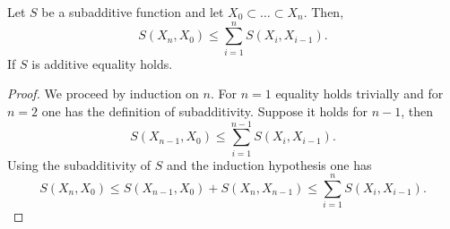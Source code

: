 \bigskip

\begin{lemma}
\label{lema__weak_desig_morse}
    Let $S$ be a subadditive function and let $X_0\subset \dots \subset X_n$. Then,
    \begin{equation*}
        S(X_n, X_0) \le \sum^n_{i=1} S(X_i,X_{i-1}).
    \end{equation*}
    If $S$ is additive equality holds.
\end{lemma}
\begin{proof}
    We proceed by induction on $n$. For $n=1$ equality holds trivially and for $n=2$ one has the definition of subadditivity. Suppose it holds for $n-1$, then
    \begin{equation*}
        S(X_{n-1}, X_0) \le \sum^{n-1}_{i=1} S(X_i,X_{i-1}).
    \end{equation*}
    Using the subadditivity of $S$ and the induction hypothesis one has
    \begin{equation*}
        S(X_n, X_0) \le S(X_{n-1}, X_0) + S(X_n, X_{n-1}) \le \sum^n_{i=1} S(X_i,X_{i-1}).
    \end{equation*}

\end{proof}

\bigskip

